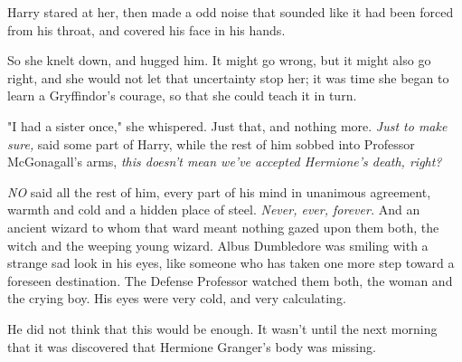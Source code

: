 Harry stared at her, then made a odd noise that sounded like it had been forced 
from his throat, and covered his face in his hands.

So she knelt down, and hugged him. It might go wrong, but it might also go 
right, and she would not let that uncertainty stop her; it was time she began 
to learn a Gryffindor's courage, so that she could teach it in turn.

"I had a sister once," she whispered. Just that, and nothing more.
\sbreak
\emph{Just to make sure,} said some part of Harry, while the rest of him sobbed 
into Professor McGonagall's arms, \emph{this doesn't mean we've accepted 
Hermione's death, right?}

\emph{NO} said all the rest of him, every part of his mind in unanimous 
agreement, warmth and cold and a hidden place of steel. \emph{Never, ever, 
forever.}
\sbreak
And an ancient wizard to whom that ward meant nothing gazed upon them both, the 
witch and the weeping young wizard. Albus Dumbledore was smiling with a strange 
sad look in his eyes, like someone who has taken one more step toward a 
foreseen destination.
\sbreak
The Defense Professor watched them both, the woman and the crying boy. His eyes 
were very cold, and very calculating.

He did not think that this would be enough.
\sbreak
It wasn't until the next morning that it was discovered that Hermione Granger's 
body was missing.
